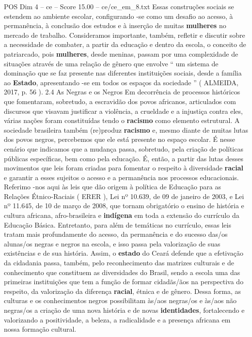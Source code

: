 \begin{textsample}{POS Dim 4 – ce – Score 15.00 – ce/ce\_em\_8.txt}
Essas construções sociais se estendem ao ambiente escolar, configurando -se como um desafio ao acesso, à permanência, à conclusão dos estudos e à inserção de muitas \textbf{mulheres} no mercado de trabalho.
Consideramos importante, também, refletir e discutir sobre a necessidade de combater, a partir da educação e dentro da escola, o conceito de patriarcado, pois \textbf{mulheres}, desde meninas, passam por uma complexidade de situações através de uma relação de gênero que envolve “ um sistema de dominação que se faz presente nas diferentes instituições sociais, desde a família ao \textbf{Estado}, apresentando -se em todos os espaços da sociedade ” ( ALMEIDA, 2017, p. 56 ). 2.4 As Negras e os Negros Em decorrência de processos históricos que fomentaram, sobretudo, a escravidão dos povos africanos, articulados com discursos que visavam justificar a violência, a crueldade e a injustiça contra eles, várias nações foram constituídas tendo o \textbf{racismo} como elemento estrutural.
A sociedade brasileira também (re)produz \textbf{racismo} e, mesmo diante de muitas lutas dos povos negros, percebemos que ele está presente no espaço escolar.
É nesse cenário que indicamos que a mudança passa, sobretudo, pela criação de políticas públicas específicas, bem como pela educação.
É, então, a partir das lutas desses movimentos que leis foram criadas para fomentar o respeito à diversidade \textbf{racial} e garantir a esses sujeitos o acesso e a permanência nos processos educacionais.
Referimo -nos aqui às leis que dão origem à política de Educação para as Relações Étnico-Raciais ( ERER ), Lei nº 10.639, de 09 de janeiro de 2003, e Lei nº 11.645, de 10 de março de 2008, que tornam obrigatório o ensino de história e cultura africana, afro-brasileira e \textbf{indígena} em toda a extensão do currículo da Educação Básica.
Entretanto, para além de temáticas no currículo, essas leis tratam mais profundamente do acesso, da permanência e do sucesso das/os alunas/os negras e negros na escola, e isso passa pela valorização de suas existências e de sua história.
Assim, o \textbf{estado} do Ceará defende que a efetivação da cidadania passa, também, pelo reconhecimento das matrizes culturais e de conhecimento que constituem as diversidades do Brasil, sendo a escola uma das primeiras instituições que tem a função de formar cidadãs/ãos na perspectiva do respeito, da valorização da diferença \textbf{racial}, étnica e de gênero.
Dessa forma, as culturas e os conhecimentos negros possibilitam às/aos negras/os e às/aos não negras/os a criação de uma nova história e de novas \textbf{identidades}, fortalecendo e valorizando a positividade, a beleza, a radicalidade e a presença africana em nossa formação cultural.

\end{textsample}
